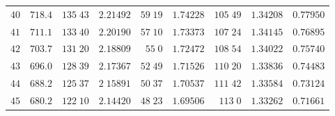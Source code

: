 \begin{center}
\begin{tabular}{r|r|r|r|r|r|r|r|r}
$40$&$718.4$&$135\;43$&$2.21492$&$59\;19$&$1.74228$&$105\;49$&$1.34208$&$0.77950$\\
$41$&$711.1$&$133\;40$&$2.20190$&$57\;10$&$1.73373$&$107\;24$&$1.34145$&$0.76895$\\
$42$&$703.7$&$131\;20$&$2.18809$&$55\;0$&$1.72472$&$108\;54$&$1.34022$&$0.75740$\\
$43$&$696.0$&$128\;39$&$2.17367$&$52\;49$&$1.71526$&$110\;20$&$1.33836$&$0.74483$\\
$44$&$688.2$&$125\;37$&$2\;15891$&$50\;37$&$1.70537$&$111\;42$&$1.33584$&$0.73124$\\[2pt]
$45$&$680.2$&$122\;10$&$2.14420$&$48\;23$&$1.69506$&$113\;0$&$1.33262$&$0.71661$\\
\hline
\end{tabular}
\end{center}
\endgroup
\clearpage
{}
\begingroup
\fontsize{9}{10.2}\selectfont
\setlength{\tabcolsep}{1.5pt}
\renewcommand{\arraystretch}{1.02}
